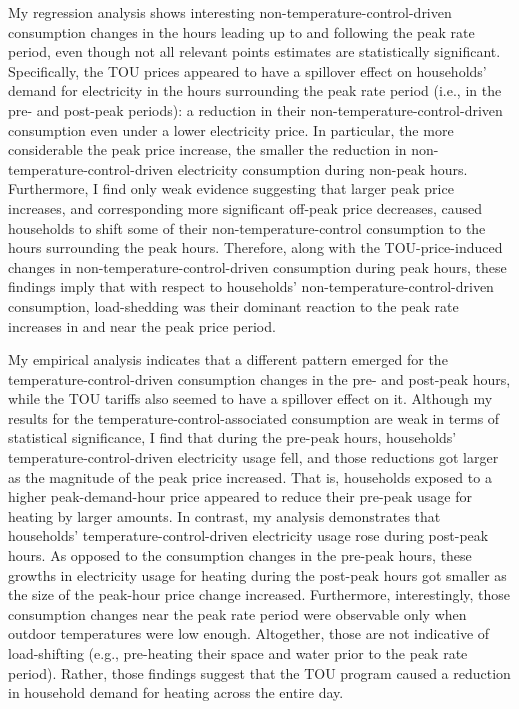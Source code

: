 My regression analysis shows interesting non-temperature-control-driven consumption changes in the hours leading up to and following the peak rate period, even though not all relevant points estimates are statistically significant. Specifically, the TOU prices appeared to have a spillover effect on households' demand for electricity in the hours surrounding the peak rate period (i.e., in the pre- and post-peak periods): a reduction in their non-temperature-control-driven consumption even under a lower electricity price. In particular, the more considerable the peak price increase, the smaller the reduction in non-temperature-control-driven electricity consumption during non-peak hours. Furthermore, I find only weak evidence suggesting that larger peak price increases, and corresponding more significant off-peak price decreases, caused households to shift some of their non-temperature-control consumption to the hours surrounding the peak hours. Therefore, along with the TOU-price-induced changes in non-temperature-control-driven consumption during peak hours, these findings imply that with respect to households' non-temperature-control-driven consumption, load-shedding was their dominant reaction to the peak rate increases in and near the peak price period.

My empirical analysis indicates that a different pattern emerged for the temperature-control-driven consumption changes in the pre- and post-peak hours, while the TOU tariffs also seemed to have a spillover effect on it. Although my results for the temperature-control-associated consumption are weak in terms of statistical significance, I find that during the pre-peak hours, households' temperature-control-driven electricity usage fell, and those reductions got larger as the magnitude of the peak price increased. That is, households exposed to a higher peak-demand-hour price appeared to reduce their pre-peak usage for heating by larger amounts. In contrast, my analysis demonstrates that households' temperature-control-driven electricity usage rose during post-peak hours. As opposed to the consumption changes in the pre-peak hours, these growths in electricity usage for heating during the post-peak hours got smaller as the size of the peak-hour price change increased. Furthermore, interestingly, those consumption changes near the peak rate period were observable only when outdoor temperatures were low enough. Altogether, those are not indicative of load-shifting (e.g., pre-heating their space and water prior to the peak rate period). Rather, those findings suggest that the TOU program caused a reduction in household demand for heating across the entire day. 

